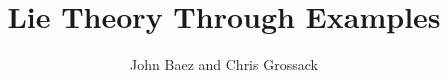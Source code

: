 \documentclass[10pt]{book}
\author{John Baez and Chris Grossack}
\title{Lie Theory Through Examples}
\theoremstyle{definition} %
\numberwithin{Exercise}{chapter} %
\begin{document}
\maketitle
\pagebreak

\tableofcontents







% 
% 
\end{document}
